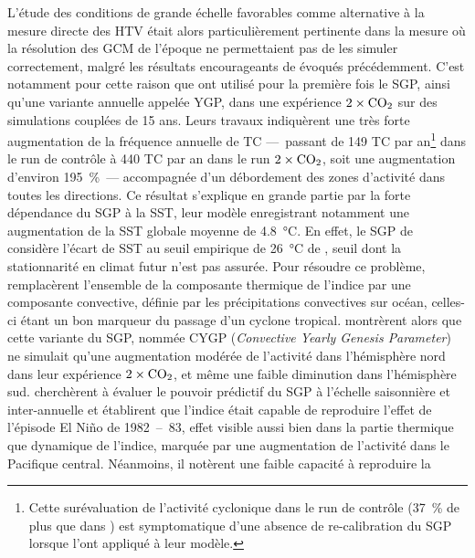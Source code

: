 \documentclass[../main.tex]{subfiles}
\begin{document}
L'étude des conditions de grande échelle favorables comme alternative à la mesure directe des HTV était alors particulièrement pertinente dans la mesure où la
résolution des GCM de l'époque ne permettaient pas de les simuler correctement, malgré les résultats encourageants de \textcite{broccoli_can_1990} évoqués
précédemment. C'est notamment pour cette raison que \hbox{\textcite{ryan_tropical_1992}} ont utilisé pour la première fois le SGP, ainsi qu'une variante
annuelle appelée YGP, dans une expérience \ensuremath{2\times\ce{CO2}} sur des simulations couplées de \num{15} ans. Leurs travaux indiquèrent une très forte
augmentation de la fréquence annuelle de TC ---~passant de \num{149} TC par an\footnote{Cette surévaluation de l'activité cyclonique dans le run de contrôle
(\SI{37}{\percent} de plus que dans \cite{gray_tropical_1975}) est symptomatique d'une absence de re-calibration du SGP lorsque
\textcite{ryan_tropical_1992} l'ont appliqué à leur modèle.} dans le run de contrôle à \num{440} TC par an dans le run \ensuremath{2\times\ce{CO2}}, soit une
augmentation d'environ \SI{195}{\percent}~--- accompagnée d'un débordement des zones d'activité dans toutes les directions. Ce résultat s'explique en grande
partie par la forte dépendance du SGP à la SST, leur modèle enregistrant notamment une augmentation de la SST globale moyenne de \SI{4.8}{\degreeCelsius}. En
effet, le SGP de \citeauthor{gray_tropical_1975} considère l'écart de SST au seuil empirique de \SI{26}{\degreeCelsius} de \textcite{palmen_formation_1948},
seuil dont la stationnarité en climat futur n'est pas assurée. Pour résoudre ce problème, \textcite{royer_gcm_1998} remplacèrent l'ensemble de la composante
thermique de l'indice par une composante convective, définie par les précipitations convectives sur océan, celles-ci étant un bon marqueur du passage d'un
cyclone tropical. \textcite{royer_gcm_1998} montrèrent alors que cette variante du SGP, nommée CYGP (\textit{Convective Yearly Genesis Parameter}) ne simulait
qu'une augmentation modérée de l'activité dans l'hémisphère nord dans leur expérience \ensuremath{2\times\ce{CO2}}, et même une faible diminution dans
l'hémisphère sud. \mbox{\textcite{watterson_seasonal_1995}} cherchèrent à évaluer le pouvoir prédictif du SGP à l'échelle saisonnière et inter-annuelle et
établirent que l'indice était capable de reproduire l'effet de l'épisode El Niño de \num{1982}~--~\num{83}, effet visible  aussi bien dans la partie thermique
que dynamique de l'indice, marquée par une augmentation de l'activité dans le Pacifique central. Néanmoins, il notèrent une faible capacité à reproduire la
\end{document}
